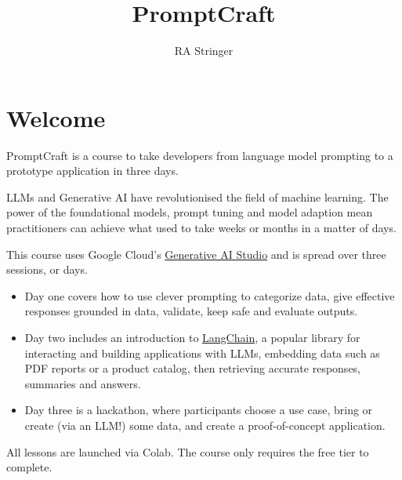 \documentclass[
  letterpaper,
  DIV=11,
  numbers=noendperiod]{scrreprt}
\title{PromptCraft}
\author{RA Stringer}
\date{}
\renewcommand*\contentsname{Table of contents}
\newcommand\contentsname{Table of contents}
\begin{document}
\maketitle
\ifdefined\Shaded\renewenvironment{Shaded}{\begin{tcolorbox}[boxrule=0pt, sharp corners, interior hidden, enhanced, borderline west={3pt}{0pt}{shadecolor}, frame hidden, breakable]}{\end{tcolorbox}}\fi

\renewcommand*\contentsname{Table of contents}
{
\hypersetup{linkcolor=}
\setcounter{tocdepth}{2}
\tableofcontents
}

\hypertarget{welcome}{%
\chapter*{Welcome}\label{welcome}}


PromptCraft is a course to take developers from language model prompting
to a prototype application in three days.

LLMs and Generative AI have revolutionised the field of machine
learning. The power of the foundational models, prompt tuning and model
adaption mean practitioners can achieve what used to take weeks or
months in a matter of days.

This course uses Google Cloud's
\href{https://cloud.google.com/ai/generative-ai}{Generative AI Studio}
and is spread over three sessions, or days.

\begin{itemize}
\item
  Day one covers how to use clever prompting to categorize data, give
  effective responses grounded in data, validate, keep safe and evaluate
  outputs.
\item
  Day two includes an introduction to
  \href{https://python.langchain.com/docs/get_started/introduction.html}{LangChain},
  a popular library for interacting and building applications with LLMs,
  embedding data such as PDF reports or a product catalog, then
  retrieving accurate responses, summaries and answers.
\item
  Day three is a hackathon, where participants choose a use case, bring
  or create (via an LLM!) some data, and create a proof-of-concept
  application.
\end{itemize}

All lessons are launched via Colab. The course only requires the free
tier to complete.
\end{document}
